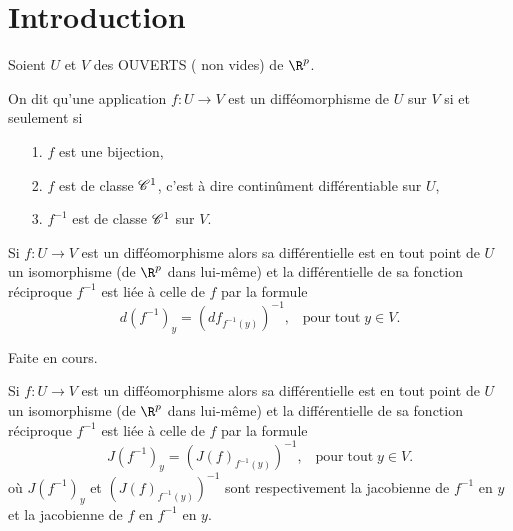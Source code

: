 \documentclass[class=report,crop=false]{standalone}
\begin{document}
\section{Introduction}
\noindent Soient $U$ et $V$ des OUVERTS ( non vides) de $\R^p$.
\begin{definition}[DIFFEOMORPHISME]
 \textcolor[rgb]{0.98,0.00,0.00}{ 
  On dit qu'une application $f: U \rightarrow V$ est un diff\'eomorphisme de $U$ sur $V$
si et seulement si
\begin{itemize}
  \item[1.] $f$ est une bijection,
  \item[2.] $f$ est de classe $\mathscr{C}^1$, c'est \`a dire contin\^ument diff\'erentiable sur $U$,
  \item[3.] $f^{-1}$ est de classe $\mathscr{C}^1$ sur $V$.
\end{itemize}}
\end{definition}

\begin{proposition}
 \textcolor[rgb]{0.44,0.00,0.87}{
  Si $f: U \rightarrow V$ est un diff\'eomorphisme alors sa diff\'erentielle est en tout point de
$U$ un isomorphisme (de $\R^p$ dans lui-même) et la diff\'erentielle de sa fonction r\'eciproque $f^{-1}$
est li\'ee \`a celle de $f$ par la formule
\begin{equation*}
  d(f^{-1})_y=(df_{f^{-1}(y)})^{-1}, \;\;\mathrm{\; pour\; tout \;} y \in V.
\end{equation*}}
\end{proposition}

 Faite en cours.




\begin{proposition}
 \textcolor[rgb]{0.44,0.00,0.87}{
  Si $f: U \rightarrow V$ est un diff\'eomorphisme alors sa diff\'erentielle est en tout point de
$U$ un isomorphisme (de $\R^p$ dans lui-même) et la diff\'erentielle de sa fonction r\'eciproque $f^{-1}$
est li\'ee \`a celle de $f$ par la formule
\begin{equation*}
  J(f^{-1})_y=(J(f)_{f^{-1}(y)})^{-1}, \;\;\mathrm{\; pour\; tout \;} y \in V.
\end{equation*}
où $ J(f^{-1})_y$ et $(J(f)_{f^{-1}(y)})^{-1}$ sont respectivement la jacobienne de $f^{-1}$ en $y$ et la jacobienne de 
$f$ en $f^{-1}$ en $y$.}
\end{proposition}
\end{document}
